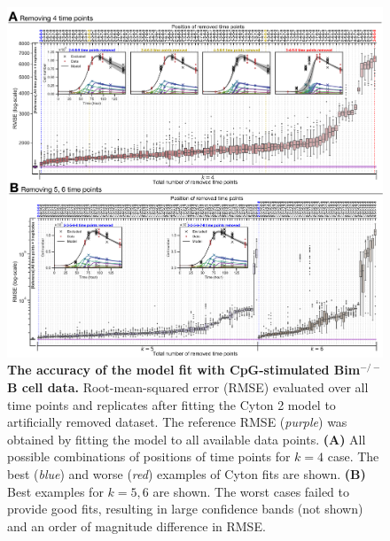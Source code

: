 \documentclass[11pt, a4paper]{article}
\begin{document}
\begin{figure}[h]
    \centering
    \includegraphics[scale=0.58]{figs/supp_fig6.pdf}
    \caption{\textbf{The accuracy of the model fit with CpG-stimulated Bim$^{-/-}$ B cell data.} Root-mean-squared error (RMSE) evaluated over all time points and replicates after fitting the Cyton 2 model to artificially removed dataset. The reference RMSE (\textit{purple}) was obtained by fitting the model to all available data points. \textbf{(A)} All possible combinations of positions of time points for $k=4$ case. The best (\textit{blue}) and worse (\textit{red}) examples of Cyton fits are shown. \textbf{(B)} Best examples for $k=5,6$ are shown. The worst cases failed to provide good fits, resulting in large confidence bands (not shown) and an order of magnitude difference in RMSE.}
    \label{supp_fig:removed_time_points}
\end{figure}
\end{document}
